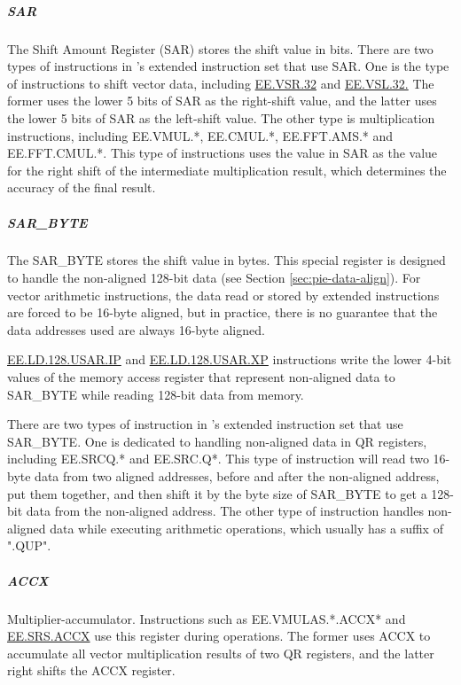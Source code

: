\documentclass[main\_\_EN.tex]{subfiles}
\begin{document}
\subparagraph{SAR}

The Shift Amount Register (SAR) stores the shift value in bits. There are two types of instructions in \chipname{}'s extended instruction set that use SAR. One is the type of instructions to shift vector data, including \hyperref[instruction:EEVSR32]{EE.VSR.32} and \hyperref[instruction:EEVSL32]{EE.VSL.32.} The former uses the lower 5 bits of SAR as the right-shift value, and the latter uses the lower 5 bits of SAR as the left-shift value. The other type is multiplication instructions, including EE.VMUL.*, EE.CMUL.*, EE.FFT.AMS.* and EE.FFT.CMUL.*. This type of instructions uses the value in SAR as the value for the right shift of the intermediate multiplication result, which determines the accuracy of the final result.

\subparagraph{SAR\_BYTE}

The SAR\_BYTE stores the shift value in bytes. This special register is designed to handle the non-aligned 128-bit data (see Section \ref{sec:pie-data-align}). For vector arithmetic instructions, the data read or stored by extended instructions are forced to be 16-byte aligned, but in practice, there is no guarantee that the data addresses used are always 16-byte aligned.

\hyperref[instruction:EELD128USARIP]{EE.LD.128.USAR.IP} and \hyperref[instruction:EELD128USARXP]{EE.LD.128.USAR.XP} instructions write the lower 4-bit values of the memory access register that represent non-aligned data to SAR\_BYTE while reading 128-bit data from memory.

There are two types of instruction in \chipname{}'s extended instruction set that use SAR\_BYTE. One is dedicated to handling non-aligned data in QR registers, including EE.SRCQ.* and EE.SRC.Q*. This type of instruction will read two 16-byte data from two aligned addresses, before and after the non-aligned address, put them together, and then shift it by the byte size of SAR\_BYTE to get a 128-bit data from the non-aligned address. The other type of instruction handles non-aligned data while executing arithmetic operations, which usually has a suffix of ".QUP".

\subparagraph{ACCX}

Multiplier-accumulator. Instructions such as EE.VMULAS.*.ACCX* and \hyperref[instruction:EESRSACCX]{EE.SRS.ACCX} use this register during operations. The former uses ACCX to accumulate all vector multiplication results of two QR registers, and the latter right shifts the ACCX register.
\end{document}
